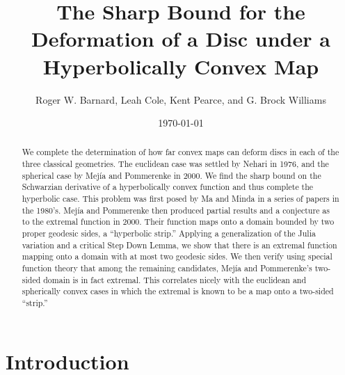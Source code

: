\documentclass{lms}
\numberwithin{equation}{section}
\begin{document}
\title[Deformation of a Disc Under a Hyperbolically Convex Map]{The Sharp Bound
  for the Deformation of a Disc under a Hyperbolically  Convex Map}

\date{\today}

\author{Roger W. Barnard, Leah Cole, Kent Pearce, and G. Brock Williams}






\maketitle

\begin{abstract}
We complete the determination of how far convex maps can deform discs in 
each of the three classical geometries.
The euclidean case was settled by Nehari in 1976, and the spherical case
by Mej\'ia and Pommerenke in 2000.
We find the sharp bound on the Schwarzian derivative of a hyperbolically convex 
function and thus complete the hyperbolic case.
 This problem was first posed by Ma and Minda in a series of papers in the 1980's.
Mej\'ia and Pommerenke then produced partial results and a conjecture
as to the extremal function in 2000.  Their function maps onto a domain bounded by
two proper geodesic sides, a ``hyperbolic strip.''
Applying a generalization of the Julia variation and a critical Step Down Lemma,
 we show that 
there is an  extremal function mapping  onto a domain with 
at most two geodesic sides.  We then verify using special function theory
that among the remaining candidates, Mej\'ia and Pommerenke's  two-sided 
domain is in fact extremal.  This correlates nicely with the euclidean
and spherically convex cases in which the extremal is known to be
a map onto a two-sided ``strip.'' 
\end{abstract}





\section{Introduction}\label{S:intro}
\end{document}
